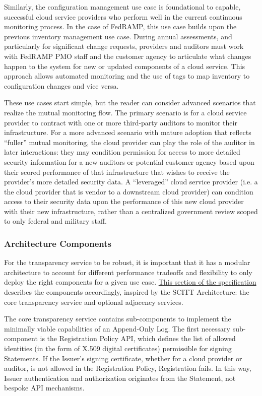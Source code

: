 \documentclass{jdf}
\begin{document}
Similarly, the configuration management use case is foundational to capable, successful cloud service providers who perform well in the current continuous monitoring process. In the case of FedRAMP, this use case builds upon the previous inventory management use case. During annual assessments, and particularly for significant change requests, providers and auditors must work with FedRAMP PMO staff and the customer agency to articulate what changes happen to the system for new or updated components of a cloud service. This approach allows automated monitoring and the use of tags to map inventory to configuration changes and vice versa.

These use cases start simple, but the reader can consider advanced scenarios that realize the mutual monitoring flow. The primary scenario is for a cloud service provider to contract with one or more third-party auditors to monitor their infrastructure. For a more advanced scenario with mature adoption that reflects ``fuller'' mutual monitoring, the cloud provider can play the role of the auditor in later interactions: they may condition permission for access to more detailed security information for a new auditors or potential customer agency based upon their scored performance of that infrastructure that wishes to receive the provider's more detailed security data. A ``leveraged'' cloud service provider (i.e. a the cloud provider that is vendor to a downstream cloud provider) can condition access to their security data upon the performance of this new cloud provider with their new infrastructure, rather than a centralized government review scoped to only federal and military staff.

\subsubsection{Architecture Components}

For the transparency service to be robust, it is important that it has a modular architecture to account for different performance tradeoffs and flexibility to only deploy the right components for a given use case. \href{https://aj-stein.github.io/conmotion/architecture.html#components}{This section of the specification} describes the components accordingly, inspired by the SCITT Architecture: the core transparency service and optional adjacency services.

The core transparency service contains sub-components to implement the minimally viable capabilities of an Append-Only Log. The first necessary sub-component is the Registration Policy API, which defines the list of allowed identities (in the form of X.509 digital certificates) permissible for signing Statements. If the Issuer's signing certificate, whether for a cloud provider or auditor, is not allowed in the Registration Policy, Registration fails. In this way, Issuer authentication and authorization originates from the Statement, not bespoke API mechanisms.
\end{document}
